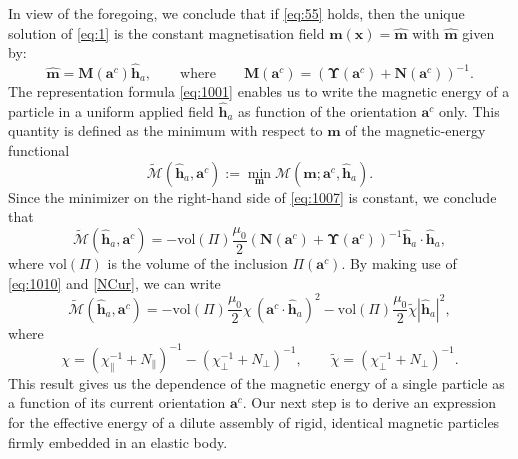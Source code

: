 \documentclass[oneside]{article}
\begin{document}
In view of the foregoing, we conclude that if \eqref{eq:55} holds, then the unique solution of \eqref{eq:1} is the constant magnetisation field $\bm m(\bm x)=\widehat{\bm m}$ with $\widehat{\bm m}$ given by:
\begin{equation}\label{eq:1001}
\widehat{\bm m}={\bm M}(\bm a^c)\widehat{\bm h}_a,\qquad \text{where}\qquad {\bm M}(\bm a^c)=(\bm\Upsilon(\bm a^c)+\bm N(\bm a^c))^{-1}.
\end{equation}
The representation formula \eqref{eq:1001} enables us to write the magnetic energy of a particle in a uniform applied field $\widehat{\bm h}_a$ as function of the orientation $\bm a^c$ only. This quantity is defined as the minimum with respect to $\bm m$ of the magnetic-energy functional 
\begin{equation}\label{eq:1007}
\widetilde{\mathcal M}(\widehat{\bm h}_a,\bm a^c):=\min_{\bm m}\mathcal M(\bm m;\bm a^c,\widehat{\bm h}_a).
\end{equation}
Since the minimizer on the right-hand side of \eqref{eq:1007} is constant, we conclude that
\begin{equation}\label{eq:9}
\widetilde{\mathcal M}(\widehat{\bm h}_a,\bm a^c)=-\text{vol}(\Pi)\frac {\mu_0}2 (\bm N(\bm a^c)+\bm\Upsilon(\bm a^c))^{-1}\widehat{\bm h}_a\cdot\widehat{\bm h}_a,
\end{equation}
where $\text{vol}(\Pi)$ is the volume of the inclusion $\Pi(\bm a^c)$. By making use of \eqref{eq:1010} and \eqref{NCur}, we can write
\begin{equation}\label{EffectiveEnergyM}
\widetilde{\mathcal M}(\widehat{\bm h}_a,\bm a^c)=-\text{vol}(\Pi)\frac {\mu_0}2 \chi\, (\bm a^c\cdot\widehat{\bm h}_a)^2-\text{vol}(\Pi)\frac{\mu_0}2 \tilde\chi|\widehat{\bm h}_a|^2,
\end{equation}
where 
\begin{equation}\label{eq:3004}
\chi=(\chi_\parallel^{-1}+N_\parallel)^{-1}-(\chi_\perp^{-1}+N_\perp)^{-1}, \qquad \tilde\chi= (\chi_\perp^{-1}+N_\perp)^{-1}.
\end{equation}
This result gives us the dependence of the magnetic energy of a single particle as a function of its current orientation $\bm a^c$. Our next step is to derive an expression for the effective energy of a dilute assembly of rigid, identical magnetic particles firmly embedded in an elastic body.
\end{document}
